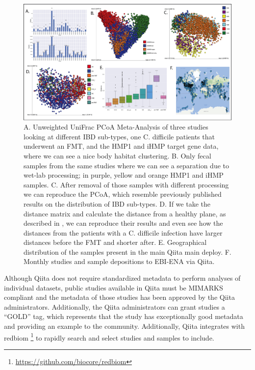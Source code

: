 \begin{figure}[htbp]
\includegraphics[width=0.75\columnwidth]{chapter_qiita_figures/Figure_1.png}
\caption[]{A. Unweighted UniFrac PCoA Meta-Analysis of three studies looking at different
IBD sub-types, one C. difficile patients that underwent an FMT, and the HMP1 and iHMP target
gene data, where we can see a nice body habitat clustering. B. Only fecal samples from the
same studies where we can see a separation due to wet-lab processing; in purple, yellow and
orange HMP1 and iHMP samples. C. After removal of those samples with different processing
we can reproduce the PCoA, which resemble previously published results on the distribution of
IBD sub-types. D. If we take the distance matrix and calculate the distance from a healthy
plane, as described in \cite{Halfvarson2017}, we can reproduce their results and even see how
the distances from the patients with a C. difficile infection have larger distances before the
FMT and shorter after. E. Geographical distribution of the samples present in the main Qiita
main deploy. F. Monthly studies and sample depositions to EBI-ENA via Qiita.}
\label{qiitafig1}
\end{figure}

Although Qiita does not require standardized metadata to perform analyses of individual datasets,
public studies available in Qiita must be MIMARKS \cite{Yilmaz2011} compliant and the metadata of
those studies has been approved by the Qiita administrators. Additionally, the Qiita administrators
can grant studies a “GOLD” tag, which represents that the study has exceptionally good metadata
and providing an example to the community. Additionally, Qiita integrates with
redbiom \footnote{\url{https://github.com/biocore/redbiom}} to rapidly search and select
studies and samples to include.

